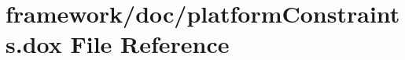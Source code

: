 \hypertarget{platform_constraints_8dox}{}\section{framework/doc/platform\+Constraints.dox File Reference}
\label{platform_constraints_8dox}
